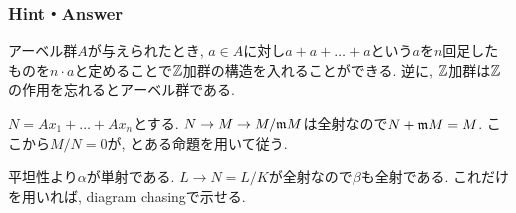 \begin{prob}
\end{prob}




\subsubsection{Hint・Answer}
\begin{probans}
アーベル群$A$が与えられたとき, $a\in A$に対し$a+a+\dots + a$という$a$を$n$回足したものを$n\cdot a$と定めることで$\mathbb{Z}$加群の構造を入れることができる. 逆に, $\mathbb{Z}$加群は$\mathbb{Z}$の作用を忘れるとアーベル群である.
\end{probans}

\begin{probans}
$N=Ax_1+\dots + Ax_n$とする. $N\to M \to M/\mathfrak{m}M$は全射なので$N+\mathfrak{m}M = M$. ここから$M/N = 0$が, とある命題を用いて従う.
\end{probans}

\begin{probans}
平坦性より$\alpha$が単射である. $L\to N=L/K$が全射なので$\beta$も全射である. これだけを用いれば, diagram chasingで示せる.
\end{probans}


